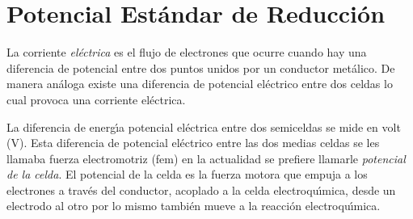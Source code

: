 \section{Potencial Est\'andar de Reducci\'on}
La corriente \textit{el\'ectrica} es el flujo de  electrones que ocurre cuando hay una diferencia de potencial entre dos puntos unidos por un conductor met\'alico. De manera an\'aloga existe una diferencia de potencial el\'ectrico entre dos celdas  lo cual provoca una corriente el\'ectrica.

La diferencia de energ\'{\i}a potencial el\'ectrica entre dos semiceldas  se mide en volt (V). Esta diferencia de potencial el\'ectrico entre las dos medias celdas se les llamaba fuerza electromotriz (\gls{fem}) en la actualidad se prefiere llamarle \textit{potencial de la celda}. El potencial de la celda es la fuerza motora que empuja a los electrones a trav\'es del conductor, acoplado a la celda electroqu\'{\i}mica, desde un electrodo al otro por lo mismo tambi\'en mueve a la reacci\'on electroqu\'{\i}mica.

